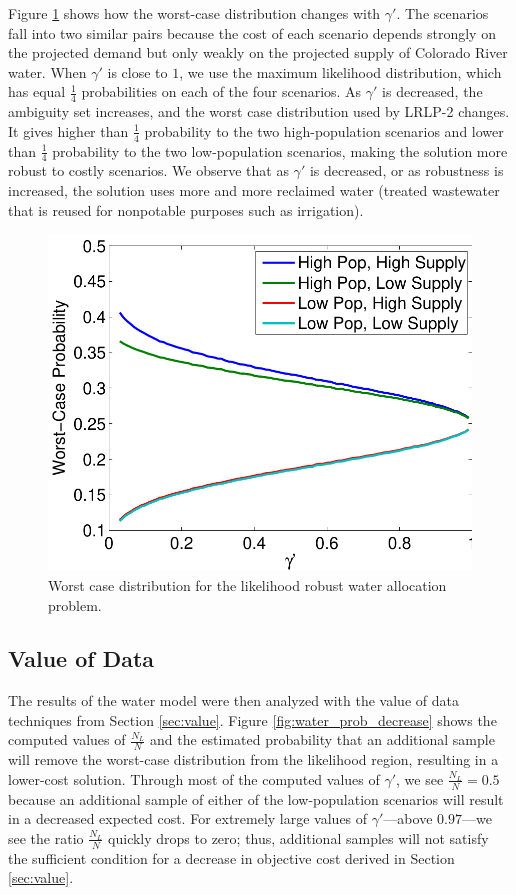 \documentclass[11pt]{article}
\begin{document}
Figure \ref{fig:worst_case} shows how the worst-case distribution changes with $\gamma'$.
The scenarios fall into two similar pairs because the cost of each scenario depends strongly on the projected demand but only weakly on the projected supply of Colorado River water.
When $\gamma'$ is close to $1$, we use the maximum likelihood distribution, which has equal $\tfrac{1}{4}$ probabilities on each of the four scenarios.
As $\gamma'$ is decreased, the ambiguity set increases, and the worst case distribution used by LRLP-2 changes.
It gives higher than $\tfrac{1}{4}$ probability to the two high-population scenarios and lower than $\tfrac{1}{4}$ probability to the two low-population scenarios, making the solution more robust to costly scenarios.
We observe that as $\gamma'$ is decreased, or as robustness is increased, the solution uses more and more reclaimed water (treated wastewater that is reused for nonpotable purposes such as irrigation).

\begin{figure}
	\centering
	\includegraphics[width=.5\textwidth]{images/worst_case_probability}
	\caption{Worst case distribution for the likelihood robust water allocation problem.}
	\label{fig:worst_case}
\end{figure}

\subsection{Value of Data}

The results of the water model were then analyzed with the value of data techniques from Section \ref{sec:value}.
Figure \ref{fig:water_prob_decrease} shows the computed values of $\frac{N_L}{N}$ and the estimated probability that an additional sample will remove the worst-case distribution from the likelihood region, resulting in a lower-cost solution. %
Through most of the computed values of $\gamma'$, we see $\frac{N_L}{N} = 0.5$ because an additional sample of either of the low-population scenarios will result in a decreased expected cost.
For extremely large values of $\gamma'$---above $0.97$---we see the ratio $\frac{N_L}{N}$ quickly drops to zero; thus, additional samples will not satisfy the sufficient condition for a decrease in objective cost derived in Section \ref{sec:value}.
\end{document}
